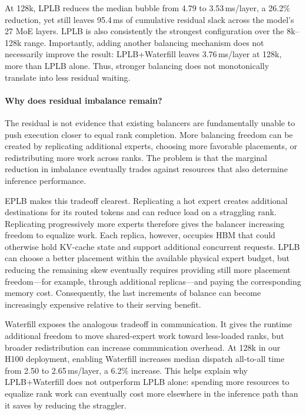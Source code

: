 At 128k, LPLB reduces the median bubble from 4.79 to
3.53\,ms/layer, a 26.2\% reduction, yet still leaves
95.4\,ms of cumulative residual slack across the model's 27 \ac{MoE}
layers. LPLB is also consistently the strongest configuration over the
8k--128k range. Importantly, adding another balancing mechanism does not
necessarily improve the result: LPLB+Waterfill leaves
3.76\,ms/layer at 128k, more than LPLB alone. Thus, stronger balancing
does not monotonically translate into less residual waiting.

\paragraph{Why does residual imbalance remain?}
The residual is not evidence that existing balancers are fundamentally
unable to push execution closer to equal rank completion. More balancing
freedom can be created by replicating additional experts, choosing more
favorable placements, or redistributing more work across ranks. The
problem is that the marginal reduction in imbalance eventually trades
against resources that also determine inference performance.

EPLB makes this tradeoff clearest. Replicating a hot expert creates
additional destinations for its routed tokens and can reduce load on a
straggling rank. Replicating progressively more experts therefore gives
the balancer increasing freedom to equalize work. Each replica, however,
occupies HBM that could otherwise hold \ac{KV}-cache state and support
additional concurrent requests. LPLB can choose a better placement
within the available physical expert budget, but reducing the remaining
skew eventually requires providing still more placement freedom---for
example, through additional replicas---and paying the corresponding
memory cost. Consequently, the last increments of balance can become
increasingly expensive relative to their serving benefit.


Waterfill exposes the analogous tradeoff in communication. It gives the
runtime additional freedom to move shared-expert work toward less-loaded
ranks, but broader redistribution can increase communication overhead.
At 128k in our H100 deployment, enabling Waterfill increases median
dispatch all-to-all time from 2.50 to 2.65\,ms/layer, a 6.2\%
increase. This helps explain why LPLB+Waterfill does not outperform LPLB
alone: spending more resources to equalize rank work can eventually cost
more elsewhere in the inference path than it saves by reducing the
straggler.

